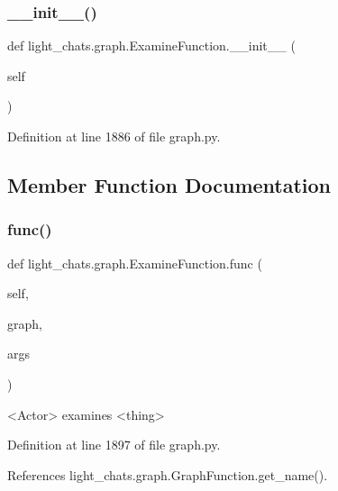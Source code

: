 \subsubsection{\texorpdfstring{\+\_\+\+\_\+init\+\_\+\+\_\+()}{\_\_init\_\_()}}
{\footnotesize\ttfamily def light\+\_\+chats.\+graph.\+Examine\+Function.\+\_\+\+\_\+init\+\_\+\+\_\+ (\begin{DoxyParamCaption}\item[{}]{self }\end{DoxyParamCaption})}



Definition at line 1886 of file graph.\+py.



\subsection{Member Function Documentation}
\mbox{\label{classlight__chats_1_1graph_1_1ExamineFunction_a5a9150659aa698ebf73e302056c5ba46}} 
\subsubsection{\texorpdfstring{func()}{func()}}
{\footnotesize\ttfamily def light\+\_\+chats.\+graph.\+Examine\+Function.\+func (\begin{DoxyParamCaption}\item[{}]{self,  }\item[{}]{graph,  }\item[{}]{args }\end{DoxyParamCaption})}

\begin{DoxyVerb}<Actor> examines <thing>\end{DoxyVerb}
 

Definition at line 1897 of file graph.\+py.



References light\+\_\+chats.\+graph.\+Graph\+Function.\+get\+\_\+name().

